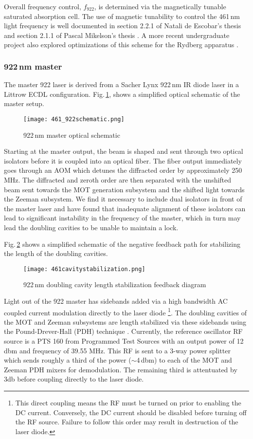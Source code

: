 Overall frequency control, $f_{922}$, is determined via the magnetically tunable saturated absorption cell.
The use of magnetic tunability to control the 461\,nm light frequency is well documented in section 2.2.1 of Natali de Escobar's thesis \cite{MartinezdeEscolar2010} and section 2.1.1 of Pascal Mikelson's thesis \cite{Mickelson2010b}.
A more recent undergraduate project also explored optimizations of this scheme for the Rydberg apparatus \cite{MichaelViray2014}.

\subsubsection{922\,nm master}
The master 922 laser is derived from a Sacher Lynx 922\,nm IR diode laser in a Littrow ECDL configuration.
Fig.\,\ref{fig:922optical}, shows a simplified optical schematic of the master setup.
	\begin{figure}
		\centerline{
		\texttt{[image: 461\_922schematic.png]}}
		\caption{922\,nm master optical schematic}
		\label{fig:922optical}
	\end{figure} 
	
Starting at the master output, the beam is shaped and sent through two optical isolators before it is coupled into an optical fiber.
The fiber output immediately goes through an AOM which detunes the diffracted order by approximately 250 MHz.
The diffracted and zeroth order are then separated with the unshifted beam sent towards the MOT generation subsystem and the shifted light towards the Zeeman subsystem.
We find it necessary to include dual isolators in front of the master laser and have found that inadequate alignment of these isolators can lead to significant instability in the frequency of the master, which in turn may lead the doubling cavities to be unable to maintain a lock.

Fig.\,\ref{fig:461cavityLock} shows a simplified schematic of the negative feedback path for stabilizing the length of the doubling cavities.
	\begin{figure}
		\centerline{
		\texttt{[image: 461cavitystabilization.png]}}
		\caption{922\,nm doubling cavity length stabilization feedback diagram}
		\label{fig:461cavityLock}
	\end{figure}
Light out of the 922 master has sidebands added via a high bandwidth AC coupled current modulation directly to the laser diode 
\footnote{This direct coupling means the RF must be turned on prior to enabling the DC current. 
Conversely, the DC current should be disabled before turning off the RF source. 
Failure to follow this order may result in destruction of the laser diode.}.
The doubling cavities of the MOT and Zeeman subsystems are length stabilized via these sidebands using the Pound-Drever-Hall (PDH) technique \cite{Drever1983}.
Currently, the reference oscillator RF source is a PTS 160 from Programmed Test Sources with an output power of 12 dbm and frequency of 39.55 MHz.
This RF is sent to a 3-way power splitter which sends roughly a third of the power ($\sim$4\,dbm) to each of the MOT and Zeeman PDH mixers for demodulation. 
The remaining third is attentuated by 3db before coupling directly to the laser diode.

